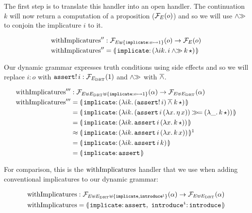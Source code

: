The first step is to translate this handler into an open handler. The
continuation $k$ will now return a computation of a proposition
($\mathcal{F}_E(o)$) and so we will use $\mathbin{\land\!\!\gg}$ to conjoin the implicature $i$ to
it.

\begin{align*}
  \withImplicatures'' &: \FF_{E \uplus \{\typedop{implicate}{o}{1}\}}(o) \to \FF_E(o) \\
  \withImplicatures'' &= \banana{\onto{\op{implicate}}{(\lam{i k}{i \andr \ap{k}{\star}})}}
\end{align*}

Our dynamic grammar expresses truth conditions using side effects and so we
will replace $i : o$ with $\mathtt{assert}!\,i : \mathcal{F}_{E_{\mathrm{DRT}}}(1)$ and
$\mathbin{\land\!\!\gg}$ with $\mathbin{\overline{\land}}$.

\begin{align*}
  \withImplicatures''' &: \FF_{E \uplus E_\DRT \uplus \{\typedop{implicate}{o}{1}\}}(\alpha)
                      \to \FF_{E \uplus E_\DRT}(\alpha) \\
  \withImplicatures''' &= \banana{\onto{\op{implicate}}{(\lam{i k}{(\ap{\op{assert}!}{i}) \dand \ap{k}{\star}})}} \\
  &= \banana{\onto{\op{implicate}}{(\lam{i k}{(\app{\op{assert}}{i}{(\lam{x}{\etaE{x}})}) \hsbind (\lam{\_}{\ap{k}{\star}})})}} \\
  &= \banana{\onto{\op{implicate}}{(\lam{i k}{\app{\op{assert}}{i}{(\lam{x}{\ap{k}{\star}})}})}} \\
  &\approx \banana{\onto{\op{implicate}}{(\lam{i k}{\app{\op{assert}}{i}{(\lam{x}{\ap{k}{x}})}})}}\footnotemark \\
  &= \banana{\onto{\op{implicate}}{(\lam{i k}{\app{\op{assert}}{i}{k}})}} \\
  &= \banana{\onto{\op{implicate}}{\op{assert}}}
\end{align*}


For comparison, this is the $\operatorname{withImplicatures}$ handler that we use when
adding conventional implicatures to our dynamic grammar:

\begin{align*}
  \withImplicatures &: \FF_{E \uplus E_\DRT \uplus \{\op{implicate},\op{introduce^i}\}}(\alpha)
                   \to \FF_{E \uplus E_\DRT}(\alpha) \\
  \withImplicatures &= \banana{\onto{\op{implicate}}{\op{assert}},\
                               \onto{\op{introduce^i}}{\op{introduce}}}
\end{align*}

